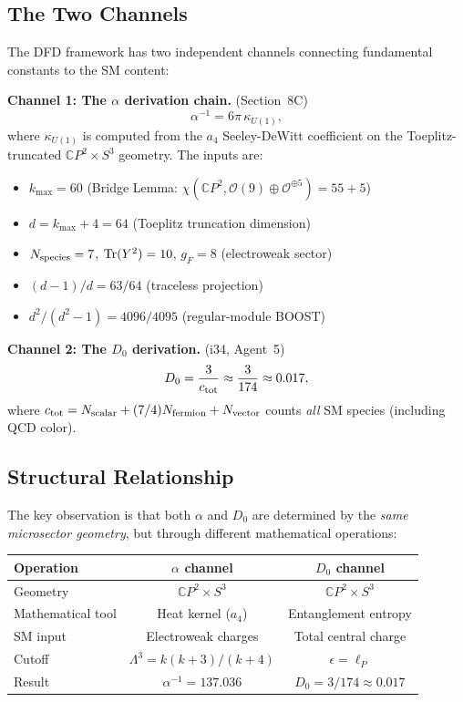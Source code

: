 \documentclass[11pt,a4paper]{article}
\begin{document}
\subsection{The Two Channels}

The DFD framework has two independent channels connecting fundamental constants to the SM content:

\textbf{Channel 1: The $\alpha$ derivation chain.} (Section~8C)
\begin{equation}
\alpha^{-1} = 6\pi\,\kappa_{U(1)},
\end{equation}
where $\kappa_{U(1)}$ is computed from the $a_4$ Seeley-DeWitt coefficient on the Toeplitz-truncated $\mathbb{C}P^2 \times S^3$ geometry. The inputs are:
\begin{itemize}
\item $k_{\max} = 60$ (Bridge Lemma: $\chi(\mathbb{C}P^2, \mathcal{O}(9) \oplus \mathcal{O}^{\oplus 5}) = 55 + 5$)
\item $d = k_{\max} + 4 = 64$ (Toeplitz truncation dimension)
\item $N_{\rm species} = 7$, ${\rm Tr}(Y^2) = 10$, $g_F = 8$ (electroweak sector)
\item $(d-1)/d = 63/64$ (traceless projection)
\item $d^2/(d^2-1) = 4096/4095$ (regular-module BOOST)
\end{itemize}

\textbf{Channel 2: The $D_0$ derivation.} (i34, Agent~5)
\begin{equation}
D_0 = \frac{3}{c_{\rm tot}} \approx \frac{3}{174} \approx 0.017,
\end{equation}
where $c_{\rm tot} = N_{\rm scalar} + (7/4)N_{\rm fermion} + N_{\rm vector}$ counts \emph{all} SM species (including QCD color).

\subsection{Structural Relationship}

The key observation is that both $\alpha$ and $D_0$ are determined by the \emph{same microsector geometry}, but through different mathematical operations:

\begin{center}
\renewcommand{\arraystretch}{1.3}
\begin{tabular}{lcc}
\toprule
\textbf{Operation} & \textbf{$\alpha$ channel} & \textbf{$D_0$ channel} \\
\midrule
Geometry & $\mathbb{C}P^2 \times S^3$ & $\mathbb{C}P^2 \times S^3$ \\
Mathematical tool & Heat kernel ($a_4$) & Entanglement entropy \\
SM input & Electroweak charges & Total central charge \\
Cutoff & $\Lambda^3 = k(k+3)/(k+4)$ & $\epsilon = \ell_P$ \\
Result & $\alpha^{-1} = 137.036$ & $D_0 = 3/174 \approx 0.017$ \\
\bottomrule
\end{tabular}
\end{center}
\end{document}

